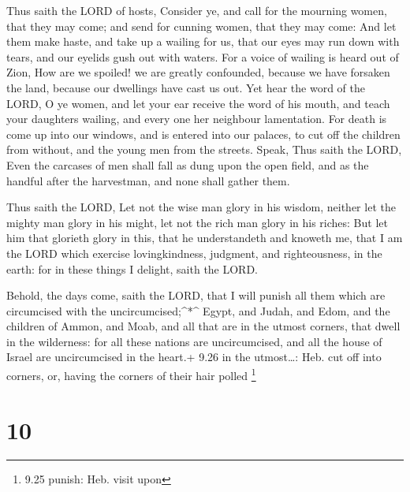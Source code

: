  Thus saith the LORD of hosts, Consider ye, and call for
the mourning women, that they may come; and send for cunning women, that
they may come:  And let them make haste, and take up a
wailing for us, that our eyes may run down with tears, and our eyelids
gush out with waters.  For a voice of wailing is heard out
of Zion, How are we spoiled! we are greatly confounded, because we have
forsaken the land, because our dwellings have cast us out. 
Yet hear the word of the LORD, O ye women, and let your ear receive the
word of his mouth, and teach your daughters wailing, and every one her
neighbour lamentation.  For death is come up into our
windows, and is entered into our palaces, to cut off the children from
without, and the young men from the streets.  Speak, Thus
saith the LORD, Even the carcases of men shall fall as dung upon the
open field, and as the handful after the harvestman, and none shall
gather them.

 Thus saith the LORD, Let not the wise man glory in his
wisdom, neither let the mighty man glory in his might, let not the rich
man glory in his riches:  But let him that glorieth glory
in this, that he understandeth and knoweth me, that I am the LORD which
exercise lovingkindness, judgment, and righteousness, in the earth: for
in these things I delight, saith the LORD.

 Behold, the days come, saith the LORD, that I will punish
all them which are circumcised with the uncircumcised;\^{}*\^{}
 Egypt, and Judah, and Edom, and the children of Ammon, and
Moab, and all that are in the utmost corners, that dwell in the
wilderness: for all these nations are uncircumcised, and all the house
of Israel are uncircumcised in the heart.+ 9.26 in the utmost\ldots:
Heb. cut off into corners, or, having the corners of their hair polled
\footnote{9.25 punish: Heb. visit upon}

\hypertarget{section-9}{%
\section{10}\label{section-9}}

